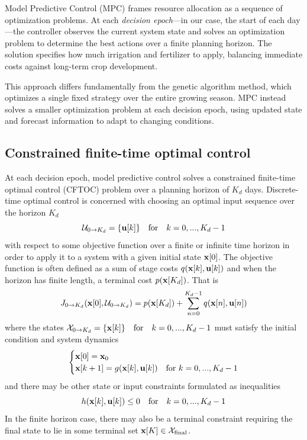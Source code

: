 \documentclass[pdflatex,sn-mathphys-num]{sn-jnl}
\begin{document}
Model Predictive Control (MPC) frames resource allocation as a sequence of optimization problems. At each \emph{decision epoch}---in our case, the start of each day---the controller observes the current system state and solves an optimization problem to determine the best actions over a finite planning horizon. The solution specifies how much irrigation and fertilizer to apply, balancing immediate costs against long-term crop development.

This approach differs fundamentally from the genetic algorithm method, which optimizes a single fixed strategy over the entire growing season. MPC instead solves a smaller optimization problem at each decision epoch, using updated state and forecast information to adapt to changing conditions.

\subsection{Constrained finite-time optimal control}\label{subsec:cftoc}

At each decision epoch, model predictive control solves a constrained finite-time optimal control (CFTOC) problem over a planning horizon of $K_{d}$ days. Discrete-time optimal control is concerned with choosing an optimal input sequence over the horizon $K_{d}$
\begin{equation}
\mathcal{U}_{0\to K_{d}} = \{ {\bf u}[k] \} \quad \text{for} \quad k=0,...,K_{d}-1
\label{eqn:U0K}
\end{equation}
with respect to some objective function over a finite or infinite time horizon in order to apply it to a system with a given initial state ${\bf x}[0]$. The objective function is often defined as a sum of stage costs $q({\bf x}[k], {\bf u}[k])$ and when the horizon has finite length, a terminal cost $p({\bf x}[K_{d}])$. That is
\begin{equation}
J_{0\to K_{d}}({\bf x}[0], \mathcal{U}_{0\to K_{d}}) = p({\bf x}[K_{d}]) + \sum_{n=0}^{K_{d}-1} q({\bf x}[n], {\bf u}[n])
\label{eqn:gen-opt-ctrl-cost}
\end{equation}
where the states $\mathcal{X}_{0\to K_{d}} = \{ {\bf x}[k] \} \quad \text{for} \quad k=0,...,K_{d}-1$ must satisfy the initial condition and system dynamics
\begin{equation}
\begin{cases}
{\bf x}[0] = {\bf x}_{0} \\
{\bf x}[k+1] = g({\bf x}[k], {\bf u}[k]) & \text{for } k=0,...,K_{d}-1
\end{cases}
\label{eqn:dyn-constraint}
\end{equation}
and there may be other state or input constraints formulated as inequalities
\begin{equation}
h({\bf x}[k], {\bf u}[k]) \leq 0 \quad \text{for} \quad k=0,...,K_{d}-1
\label{eqn:ineq-constraints}
\end{equation}
In the finite horizon case, there may also be a terminal constraint requiring the final state to lie in some terminal set ${\bf x}[K]\in\mathcal{X}_{\text{final}}$.
\end{document}
